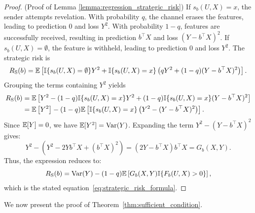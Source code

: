 \begin{proof}(Proof of Lemma \ref{lemma:regression_strategic_risk})\label{proof:strategic_risk}\label{app:proof_strategic_risk}
If $s_b(U,X) = x$, the sender attempts revelation. With probability $q$, the channel erases the features, leading to prediction $0$ and loss $Y^2$. With probability $1 - q$, features are successfully received, resulting in prediction $b^\top X$ and loss $(Y - b^\top X)^2$. If $s_b(U,X) = \emptyset$, the feature is withheld, leading to prediction $0$ and loss $Y^2$.
The strategic risk is
\begin{equation*}
    R_{\mathrm{S}}(b) = \mathbb{E}\left[ \mathbb{I}\{s_b(U,X) = \emptyset\} Y^2 + \mathbb{I}\{s_b(U,X) = x\} \left( q Y^2 + (1 - q)(Y - b^\top X)^2 \right) \right].
\end{equation*}
Grouping the terms containing $Y^2$ yields
\begin{align*}
    R_{\mathrm{S}}(b) &= \mathbb{E}\left[ Y^2 - (1 - q)\mathbb{I}\{s_b(U,X) = x\} Y^2 + (1 - q)\mathbb{I}\{s_b(U,X) = x\} (Y - b^\top X)^2 \right] \nonumber \\
    &= \mathbb{E}\left[ Y^2 \right] - (1 - q) \mathbb{E}\left[ \mathbb{I}\{s_b(U,X) = x\} \left( Y^2 - (Y - b^\top X)^2 \right) \right].
\end{align*}
Since $\mathbb{E}[Y] = 0$, we have $\mathbb{E}[Y^2] = \mathrm{Var}(Y)$. Expanding the term $Y^2 - (Y - b^\top X)^2$ gives:
\begin{equation*}
    Y^2 - (Y^2 - 2Y b^\top X + (b^\top X)^2) = (2Y - b^\top X)b^\top X = G_b(X, Y).
\end{equation*}
Thus, the expression reduces to:
\begin{equation*}
    R_{\mathrm{S}}(b) = \mathrm{Var}(Y) - (1 - q)\mathbb{E}\left[ G_b(X, Y) \mathbb{I}\{F_b(U, X) > 0\} \right],
\end{equation*}
which is the stated equation~\eqref{eq:strategic_risk_formula}.
\end{proof}

We now present the proof of Theorem~\ref{thm:sufficient_condition}.

